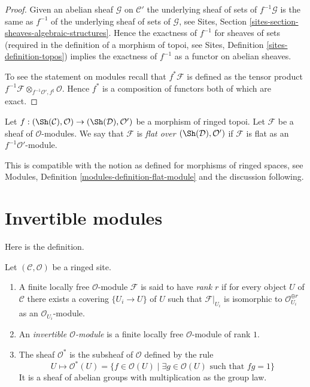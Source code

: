 \begin{proof}
Given an abelian sheaf $\mathcal{G}$ on $\mathcal{C}'$
the underlying sheaf of sets of $f^{-1}\mathcal{G}$ is the same
as $f^{-1}$ of the underlying sheaf of sets of $\mathcal{G}$, see
Sites, Section \ref{sites-section-sheaves-algebraic-structures}.
Hence the exactness of $f^{-1}$ for sheaves of sets (required in the
definition of a morphism of topoi, see
Sites, Definition \ref{sites-definition-topos})
implies the exactness of $f^{-1}$ as a functor on abelian sheaves.

\medskip\noindent
To see the statement on modules recall that $f^*\mathcal{F}$ is defined
as the tensor product
$f^{-1}\mathcal{F} \otimes_{f^{-1}\mathcal{O}', f^\sharp} \mathcal{O}$.
Hence $f^*$ is a composition of functors both of which are exact.
\end{proof}

\begin{definition}
\label{definition-flat-module}
Let $f : (\Sh(\mathcal{C}), \mathcal{O}) \to (\Sh(\mathcal{D}), \mathcal{O}')$
be a morphism of ringed topoi. Let $\mathcal{F}$ be a sheaf of
$\mathcal{O}$-modules. We say that $\mathcal{F}$ is
{\it flat over $(\Sh(\mathcal{D}), \mathcal{O}')$} if
$\mathcal{F}$ is flat as an $f^{-1}\mathcal{O}'$-module.
\end{definition}

\noindent
This is compatible with the notion as defined for morphisms of ringed spaces,
see Modules, Definition \ref{modules-definition-flat-module}
and the discussion following.





\section{Invertible modules}
\label{section-invertible}

\noindent
Here is the definition.

\begin{definition}
\label{definition-invertible-sheaf}
Let $(\mathcal{C}, \mathcal{O})$ be a ringed site.
\begin{enumerate}
\item A finite locally free $\mathcal{O}$-module $\mathcal{F}$ is said
to have {\it rank $r$} if for every object $U$ of $\mathcal{C}$ there
exists a covering $\{U_i \to U\}$ of $U$ such that $\mathcal{F}|_{U_i}$
is isomorphic to $\mathcal{O}_{U_i}^{\oplus r}$ as an
$\mathcal{O}_{U_i}$-module.
\item An {\it invertible $\mathcal{O}$-module} is a finite locally
free $\mathcal{O}$-module of rank $1$.
\item The sheaf {\it $\mathcal{O}^*$} is the subsheaf of
$\mathcal{O}$ defined by the rule
$$
U \longmapsto \mathcal{O}^*(U) = \{f \in \mathcal{O}(U) \mid
\exists g \in \mathcal{O}(U)\text{ such that }fg = 1\}
$$
It is a sheaf of abelian groups with multiplication as the group law.
\end{enumerate}
\end{definition}

